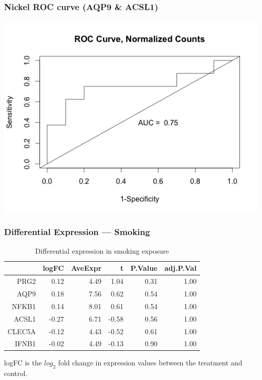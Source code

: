 \documentclass{beamer}
\begin{document}
\begin{frame}
	\frametitle{Nickel ROC curve (AQP9 \& ACSL1)}
		\centering
	 	\includegraphics[scale=0.45]{../paper/figs/Nickel_ASCL1-APQ9.png} 
\end{frame}


\begin{frame}[fragile]
  	\frametitle{Differential Expression --- Smoking}
 		\begin{table}[ht]
		\caption {Differential expression in smoking exposure} \label{tab:smoking} 
		\centering
		\begin{tabular}{rrrrrr}
 		 	\hline
 			& logFC & AveExpr & t & P.Value & adj.P.Val \\ 
 			 \hline
			PRG2 & 0.12 & 4.49 & 1.04 & 0.31 & 1.00 \\ 
  			AQP9 & 0.18 & 7.56 & 0.62 & 0.54 & 1.00 \\ 
  			NFKB1 & 0.14 & 8.01 & 0.61 & 0.54 & 1.00 \\ 
  			ACSL1 & -0.27 & 6.71 & -0.58 & 0.56 & 1.00 \\ 
  			CLEC5A & -0.12 & 4.43 & -0.52 & 0.61 & 1.00 \\ 
  			IFNB1 & -0.02 & 4.49 & -0.13 & 0.90 & 1.00 \\ 
  			\hline
		\end{tabular}
		\end{table}
		\small logFC is the $log_{2}$ fold change in expression values between the treatment and control.
\end{frame}
\end{document}
